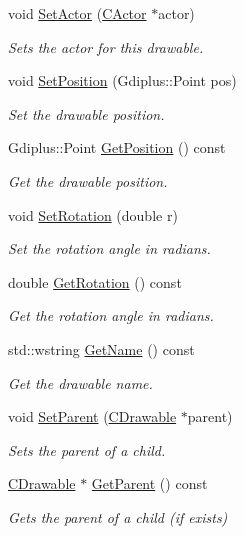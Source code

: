 \begin{DoxyCompactItemize}
void \hyperlink{class_c_drawable_a86762c6e220d9f502c6ccf9baf1135ac}{Set\+Actor} (\hyperlink{class_c_actor}{C\+Actor} $\ast$actor)
\begin{DoxyCompactList}\small\item\em Sets the actor for this drawable. \end{DoxyCompactList}\item 
void \hyperlink{class_c_drawable_aa6b8988df847a76c30dfcf525ab65449}{Set\+Position} (Gdiplus\+::\+Point pos)
\begin{DoxyCompactList}\small\item\em Set the drawable position. \end{DoxyCompactList}\item 
Gdiplus\+::\+Point \hyperlink{class_c_drawable_ac1def1d34d8069e3985e3a423ba80f2d}{Get\+Position} () const 
\begin{DoxyCompactList}\small\item\em Get the drawable position. \end{DoxyCompactList}\item 
void \hyperlink{class_c_drawable_ab1191ba99b869690839ff20cd0cc45c4}{Set\+Rotation} (double r)
\begin{DoxyCompactList}\small\item\em Set the rotation angle in radians. \end{DoxyCompactList}\item 
double \hyperlink{class_c_drawable_afb31912cfe47cc336dfbef384181ca65}{Get\+Rotation} () const 
\begin{DoxyCompactList}\small\item\em Get the rotation angle in radians. \end{DoxyCompactList}\item 
std\+::wstring \hyperlink{class_c_drawable_a45af045c285cd0be9340a9a0d9883260}{Get\+Name} () const 
\begin{DoxyCompactList}\small\item\em Get the drawable name. \end{DoxyCompactList}\item 
void \hyperlink{class_c_drawable_ad53fc2430248f2ac022ab142024df983}{Set\+Parent} (\hyperlink{class_c_drawable}{C\+Drawable} $\ast$parent)
\begin{DoxyCompactList}\small\item\em Sets the parent of a child. \end{DoxyCompactList}\item 
\hyperlink{class_c_drawable}{C\+Drawable} $\ast$ \hyperlink{class_c_drawable_ab09e86c9bb408d5e2756ab6b439a674c}{Get\+Parent} () const 
\begin{DoxyCompactList}\small\item\em Gets the parent of a child (if exists) \end{DoxyCompactList}\end{DoxyCompactItemize}
